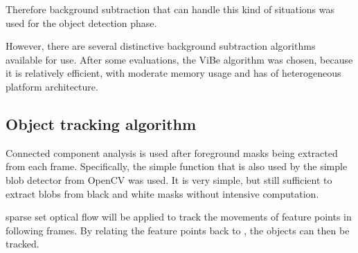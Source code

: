  Therefore background subtraction that can handle this kind of situations was used for the object detection phase.

However, there are several distinctive background subtraction algorithms available for use. After some evaluations, the ViBe algorithm was chosen, because it is relatively efficient, with moderate memory usage and has  of heterogeneous platform architecture.

\subsection{Object tracking algorithm}

Connected component analysis is used after foreground masks being extracted from each frame. Specifically, the simple  function that is also used by the simple blob detector from OpenCV was used. It is very simple, but still sufficient to extract blobs from black and white masks without intensive computation.


 sparse set optical flow will be applied to track the movements of feature points in following frames. By relating the feature points back to , the objects can then be tracked.

